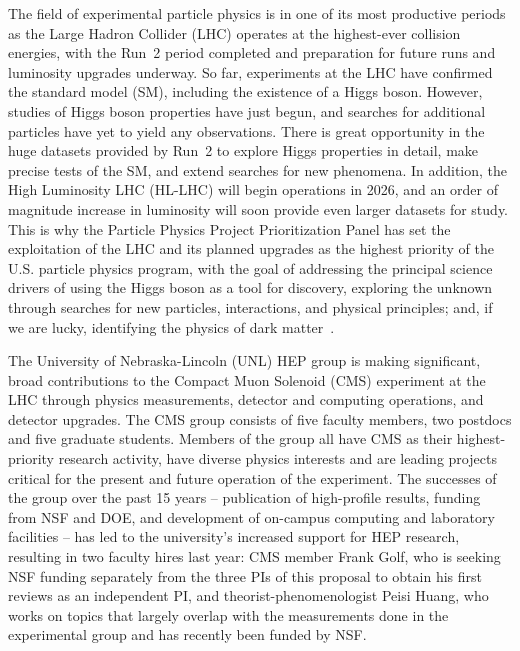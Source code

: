 \noindent
The field of experimental particle physics is in one of its most productive periods as the Large Hadron Collider (LHC) operates at the highest-ever collision energies, with the Run~2 period completed and preparation for future runs and  luminosity upgrades underway.
%
So far, experiments at the LHC have confirmed the standard model (SM), including the existence of a Higgs boson.  However, studies of Higgs boson properties have just begun, and searches for additional particles have yet to yield any observations. There is great opportunity in the huge datasets provided by Run~2 to explore Higgs properties in detail, make precise tests of the SM, and extend searches for new phenomena.  In addition, the High Luminosity LHC (HL-LHC) will begin operations in 2026, and an order of magnitude increase in luminosity will soon provide even larger datasets for study.  This is why the Particle Physics Project Prioritization Panel has set the exploitation of the LHC and its planned upgrades as the highest priority of the U.S. particle physics program, with the goal of addressing the principal science drivers of using the Higgs boson as a tool for discovery, exploring the unknown through searches for new particles, interactions, and physical principles; and, if we are lucky, identifying the physics of dark matter~\cite{bib:P5}.

The University of Nebraska-Lincoln (UNL) HEP group is making significant, broad contributions to the Compact Muon Solenoid (CMS) experiment at the LHC through physics measurements, detector and computing operations, and detector upgrades. The CMS group consists of five faculty members, two postdocs and five graduate students. Members of the group all have CMS as their highest-priority research activity, have diverse physics interests and are leading projects critical for the present and future operation of the experiment.  The successes of the group over the past 15 years -- publication of high-profile results, funding from NSF and DOE, and development of on-campus computing and laboratory facilities -- has led to the university's increased support for HEP research, resulting in two faculty hires last year: CMS member Frank Golf, who is seeking NSF funding separately from the three PIs of this proposal to obtain his first reviews as an independent PI, and theorist-phenomenologist Peisi Huang, who works on topics that largely overlap with the measurements done in the experimental group and has recently been funded by NSF.

